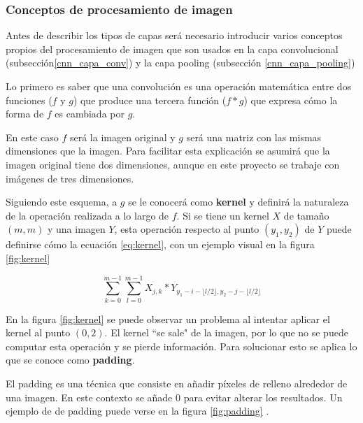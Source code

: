 \subsubsection{Conceptos de procesamiento de imagen}

Antes de describir los tipos de capas será necesario introducir varios conceptos propios del procesamiento de imagen que son usados en la capa convolucional (subsección\ref{cnn_capa_conv}) y la capa pooling (subsección \ref{cnn_capa_pooling})

Lo primero es saber que una convolución es una operación matemática entre dos funciones ($f$ y $g$) que produce una tercera función ($f*g$) que expresa cómo la forma de $f$ es cambiada por $g$. \cite{wikipedia_convolution}

En este caso $f$ será la imagen original y $g$ será una matriz con las mismas dimensiones que la imagen. Para facilitar esta explicación se asumirá que la imagen original tiene dos dimensiones, aunque en este proyecto se trabaje con imágenes de tres dimensiones.

Siguiendo este esquema, a $g$ se le conocerá como \textbf{kernel} y definirá la naturaleza de la operación realizada a lo largo de $f$. Si se tiene un kernel $X$ de tamaño $(m,m)$ y una imagen $Y$, esta operación respecto al punto $(y_1, y_2)$ de $Y$ puede definirse cómo la ecuación \ref{eq:kernel}, con un ejemplo visual en la figura \ref{fig:kernel} \cite{convolutionsforimages}

\begin{equation}\label{eq:kernel}
\sum_{k=0}^{m-1}\sum_{l=0}^{m-1} X_{j,k} * Y_{y_1 - i-\lfloor l/2 \rfloor, y_2 -  j -\lfloor l/2 \rfloor}
\end{equation}


En la figura \ref{fig:kernel} se puede observar un problema al intentar aplicar el kernel al punto $(0,2)$. El kernel ``se sale" de la imagen, por lo que no se puede computar esta operación y se pierde información. Para solucionar esto se aplica lo que se conoce como \textbf{padding}.

El padding es una técnica que consiste en añadir píxeles de relleno alrededor de una imagen. En este contexto se añade 0 para evitar alterar los resultados. Un ejemplo de de padding puede verse en la figura \ref{fig:padding} \cite{paddingandstride}.

